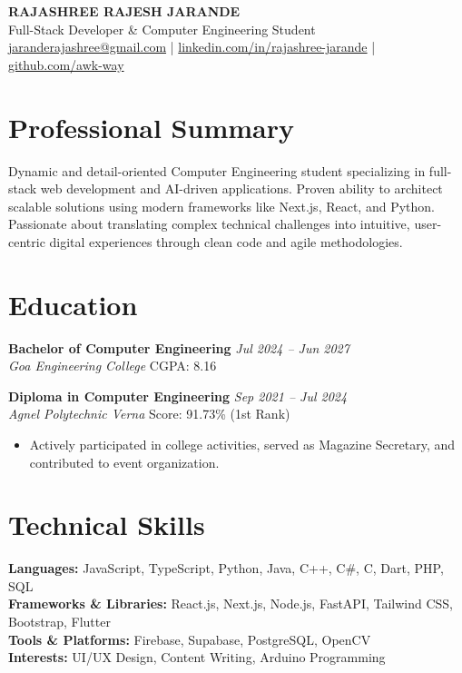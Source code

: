 \documentclass[a4paper,10pt]{article}
\begin{document}
\begin{center}
    {\Huge \textbf{\color{primary} RAJASHREE RAJESH JARANDE}} \\[4pt]
    {\large Full-Stack Developer \& Computer Engineering Student} \\[6pt]
    \small
    \href{mailto:jaranderajashree@gmail.com}{jaranderajashree@gmail.com} \quad | \quad
    \href{https://linkedin.com/in/rajashree-jarande-636459286/}{linkedin.com/in/rajashree-jarande} \quad | \quad
    \href{https://github.com/awk-way}{github.com/awk-way} \quad 
\end{center}

\section*{Professional Summary}
Dynamic and detail-oriented Computer Engineering student specializing in full-stack web development and AI-driven applications. Proven ability to architect scalable solutions using modern frameworks like Next.js, React, and Python. Passionate about translating complex technical challenges into intuitive, user-centric digital experiences through clean code and agile methodologies.

\section*{Education}
\noindent \textbf{Bachelor of Computer Engineering} \hfill \textit{Jul 2024 -- Jun 2027} \\
\textit{Goa Engineering College} \hfill CGPA: 8.16

\vspace{1ex}
\noindent \textbf{Diploma in Computer Engineering} \hfill \textit{Sep 2021 -- Jul 2024} \\
\textit{Agnel Polytechnic Verna} \hfill Score: 91.73\% (1st Rank)
\begin{itemize}
    \item Actively participated in college activities, served as Magazine Secretary, and contributed to event organization.
\end{itemize}

\section*{Technical Skills}
\noindent \textbf{Languages:} JavaScript, TypeScript, Python, Java, C++, C\#, C, Dart, PHP, SQL \\
\textbf{Frameworks \& Libraries:} React.js, Next.js, Node.js, FastAPI, Tailwind CSS, Bootstrap, Flutter \\
\textbf{Tools \& Platforms:} Firebase, Supabase, PostgreSQL, OpenCV \\
\textbf{Interests:} UI/UX Design, Content Writing, Arduino Programming
\end{document}
